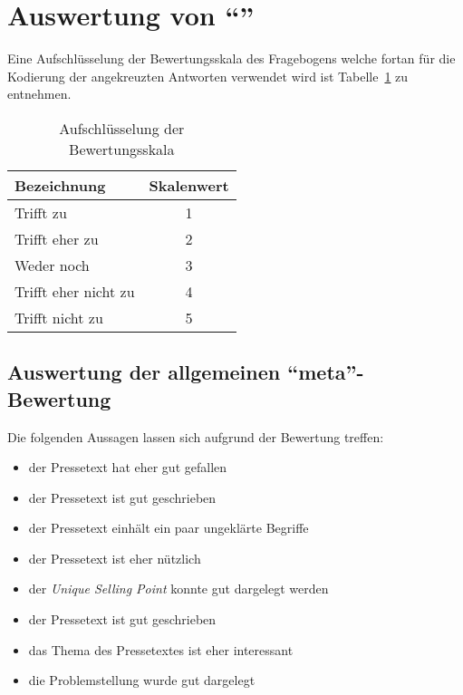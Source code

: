 


 





\section{Auswertung von \enquote{\varpressetext}}

Eine Aufschlüsselung der Bewertungsskala des Fragebogens welche fortan für die
Kodierung der angekreuzten Antworten verwendet wird ist
Tabelle~\ref{tab:skala} zu entnehmen.

\begin{table}[!ht]
    \caption{Aufschlüsselung der Bewertungsskala}
    \label{tab:skala}
    \begin{center}
        \begin{tabular}{lc}
        \toprule
        \textbf{Bezeichnung} & \textbf{Skalenwert} \\
        \midrule
        Trifft zu & 1 \\
        Trifft eher zu & 2 \\
        Weder noch & 3 \\
        Trifft eher nicht zu & 4 \\
        Trifft nicht zu & 5 \\
        \bottomrule
        \end{tabular}
    \end{center}
\end{table}

\subsection{Auswertung der allgemeinen \enquote{meta}-Bewertung}

Die folgenden Aussagen lassen sich aufgrund der Bewertung treffen:

\begin{itemize}
    \item der Pressetext hat eher gut gefallen
    \item der Pressetext ist gut geschrieben
    \item der Pressetext einhält ein paar ungeklärte Begriffe
    \item der Pressetext ist eher nützlich
    \item der \emph{Unique Selling Point} konnte gut dargelegt werden
    \item der Pressetext ist gut geschrieben
    \item das Thema des Pressetextes ist eher interessant
    \item die Problemstellung wurde gut dargelegt
\end{itemize}


